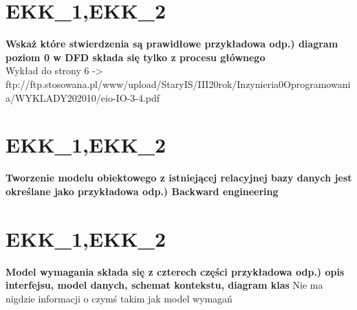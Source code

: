 \section{EKK\_1,EKK\_2}
\textbf{Wskaż które stwierdzenia są prawidłowe 
przykładowa odp.) diagram poziom 0 w DFD składa się tylko z procesu głównego
}\\
Wykład do strony 6 -> ftp://ftp.stosowana.pl/www/upload/StaryIS/III20rok/Inzynieria0Oprogramowania/WYKLADY202010/eio-IO-3-4.pdf
\section{EKK\_1,EKK\_2}
\textbf{Tworzenie modelu obiektowego z istniejącej relacyjnej bazy danych jest określane jako
przykładowa odp.) Backward engineering
}
\section{EKK\_1,EKK\_2}
\textbf{Model wymagania składa się z czterech części
przykładowa odp.) opis interfejsu, model danych, schemat kontekstu, diagram klas
}
Nie ma nigdzie informacji o czymś takim jak model wymagań 
